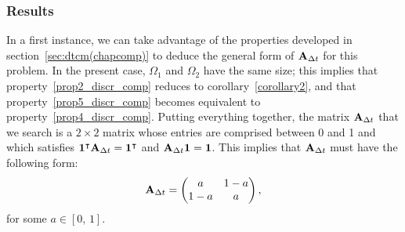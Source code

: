 \subsubsection{Results}
In a first instance, we can take advantage of the properties developed in section~\ref{sec:dtcm(chapcomp)} to deduce the general form of $\mathbf A_{\Delta t}$ for this problem. In the present case, $\Omega_1$ and $\Omega_2$ have the same size; this implies that property~\ref{prop2_discr_comp} reduces to corollary~\ref{corollary2}, and that property~\ref{prop5_discr_comp} becomes equivalent to property~\ref{prop4_discr_comp}. Putting everything together, the matrix $\mathbf A_{\Delta t}$ that we search is a $2 \times 2$ matrix whose entries are comprised between 0 and 1 and which satisfies $\mathbf 1^\intercal \mathbf A_{\Delta t} = \mathbf 1^\intercal$ and $\mathbf A_{\Delta t} \mathbf 1= \mathbf 1$. This implies that $\mathbf A_{\Delta t}$ must have the following form:
\begin{equation} \label{eq:generalformAdeltat}
	\mathbf A_{\Delta t} = \begin{pmatrix}
		a & 1-a\\ 1-a & a
	\end{pmatrix},
\end{equation}
for some $a \in [0,\,1]$.

